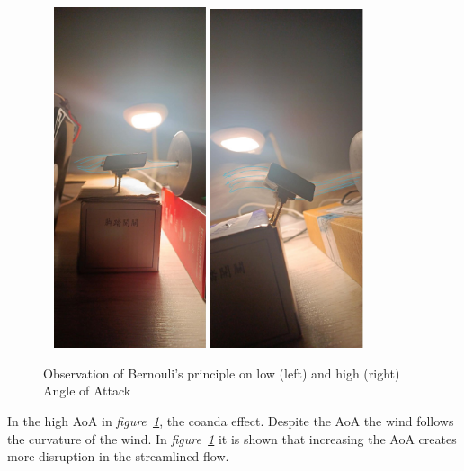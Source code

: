 \documentclass[11pt, a4paper]{article}
\begin{document}
\begin{figure}[H]
    \caption{Observation of Bernouli's principle on low (left) and high (right) Angle of Attack} 
    \centering 
~\label{fig:lowHighAoA}
    \includegraphics[width=0.4\textwidth]{images/low_downforce_wing.jpg}\hfill
    \includegraphics[width=0.4\textwidth]{images/high_downforce_wing.jpg}
\end{figure} 
In the high AoA in \textit{figure~\ref{fig:lowHighAoA}}, the coanda effect. Despite the AoA
the wind follows the curvature of the wind. In \textit{figure~\ref{fig:lowHighAoA}} it is shown that increasing
the AoA creates more disruption in the streamlined flow.
\end{document}

